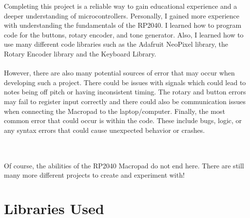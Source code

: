 \documentclass{article}
\begin{document}
Completing this project is a reliable way to gain educational experience and a deeper understanding of microcontrollers. Personally, I gained more experience with understanding the fundamentals of the RP2040. I learned how to program code for the buttons, rotary encoder, and tone generator. Also, I learned how to use many different code libraries such as the Adafruit NeoPixel library, the Rotary Encoder library and the Keyboard Library.\\\\

However, there are also many potential sources of error that may occur when developing such a project. There could be issues with signals which could lead to notes being off pitch or having inconsistent timing. The rotary and button errors may fail to register input correctly and there could also be communication issues when connecting the Macropad to the laptop/computer. Finally, the most common error that could occur is within the code. These include bugs, logic, or any syntax errors that could cause unexpected behavior or crashes. \\\\\

Of course, the abilities of the RP2040 Macropad do not end here. There are still many more different projects to create and experiment with!

\section{Libraries Used}
\end{document}
